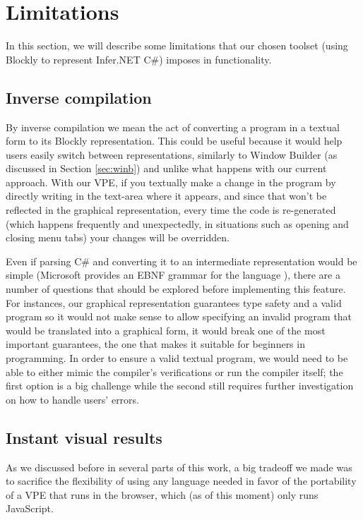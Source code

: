 \section{Limitations}

In this section, we will describe some limitations that our chosen toolset (using
Blockly to represent Infer.NET C#) imposes in functionality.

\subsection{Inverse compilation}

By inverse compilation we mean the act of converting a program in a textual form
to its Blockly representation. This could be useful because it would help users
easily switch between representations, similarly to Window Builder (as discussed in Section \ref{sec:winb})
and unlike what happens with our current approach.
With our VPE, if you textually make a change in the program by directly
writing in the text-area where it appears,
and since that won't be reflected in the graphical representation, every time
the code is re-generated (which happens frequently and unexpectedly, in situations
such as opening and closing menu tabs) your changes will be overridden.

Even if parsing C# and converting it to an intermediate representation would be
simple (Microsoft provides an EBNF grammar for the language \cite{ebnfcs}), there
are a number of questions that should be explored before implementing this feature.
For instances, our graphical representation guarantees type safety and a valid
program so it would not make sense to allow specifying an invalid program that
would be translated into a graphical form, it would break one of the most important
guarantees, the one that makes it suitable for beginners in programming. In
order to ensure a valid textual program, we would need to be able to either mimic
the compiler's verifications or run the compiler itself; the first option is
a big challenge while the second still requires further investigation on how
to handle users' errors.

\subsection{Instant visual results}

As we discussed before in several parts of this work, a big tradeoff we made was
to sacrifice the flexibility of using any language needed in favor of the portability
of a VPE that runs in the browser, which (as of this moment) only runs JavaScript.


